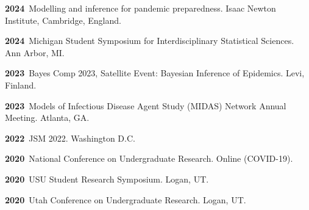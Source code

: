\documentclass[11pt]{article}
\newenvironment {reflist}
                {
                 \begin{list}{}
                 {\setlength{\labelwidth}{0mm}
                  \setlength{\leftmargin}{8mm}
                  \setlength{\itemindent}{-3mm}
                  \setlength{\labelsep}{0mm}
                  \setlength{\parsep}{0.1 ex}
                  \setlength{\itemsep}{0.1cm}
      \setlength{\topsep}{0.15cm}}} %
   {\end{list}}
\begin{document}
\begin{reflist}

    \item \textbf{2024}\, Modelling and inference for pandemic preparedness. Isaac Newton Institute, Cambridge, England.

    \item \textbf{2024}\, Michigan Student Symposium for Interdisciplinary Statistical Sciences. Ann Arbor, MI.

    \item \textbf{2023}\, Bayes Comp 2023, Satellite Event: Bayesian Inference of Epidemics. Levi, Finland.

    \item \textbf{2023}\, Models of Infectious Disease Agent Study (MIDAS) Network Annual Meeting. Atlanta, GA.

    \item \textbf{2022}\, JSM 2022. Washington D.C.

     \item \textbf{2020}\, National Conference on Undergraduate Research. Online (COVID-19).

    \item \textbf{2020}\, USU Student Research Symposium. Logan, UT.

    \item \textbf{2020}\, Utah Conference on Undergraduate Research. Logan, UT.


\end{reflist}
\end{document}
